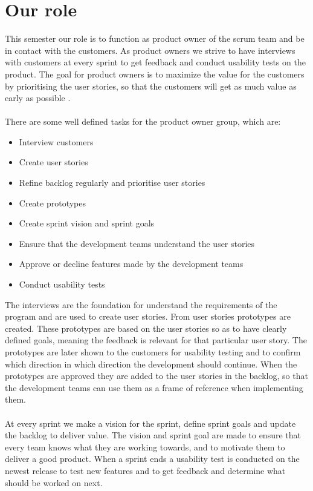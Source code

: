 \section{Our role}
This semester our role is to function as product owner of the scrum team and be in contact with the customers.
As product owners we strive to have interviews with customers at every sprint to get feedback and conduct usability tests on the product. 
The goal for product owners is to maximize the value for the customers by prioritising the user stories, so that the customers will get as much value as early as possible \autocite{TheScrumGuide}.\\
\\
There are some well defined tasks for the product owner group, which are:
\begin{itemize}
    \item Interview customers
    \item Create user stories    
    \item Refine backlog regularly and prioritise user stories
    \item Create prototypes
    \item Create sprint vision and sprint goals
    \item Ensure that the development teams understand the user stories
    \item Approve or decline features made by the development teams
    \item Conduct usability tests
\end{itemize}
\noindent
The interviews are the foundation for understand the requirements of the program and are used to create user stories. 
From user stories prototypes are created.
These prototypes are based on the user stories so as to have clearly defined goals, meaning the feedback is relevant for that particular user story.
The prototypes are later shown to the customers for usability testing and to confirm which direction in which direction the development should continue.
When the prototypes are approved they are added to the user stories in the backlog, so that the development teams can use them as a frame of reference when implementing them.
\\\\
At every sprint we make a vision for the sprint, define sprint goals and update the backlog to deliver value. 
The vision and sprint goal are made to ensure that every team knows what they are working towards, and to motivate them to deliver a good product.
When a sprint ends a usability test is conducted on the newest release to test new features and to get feedback and determine what should be worked on next.
